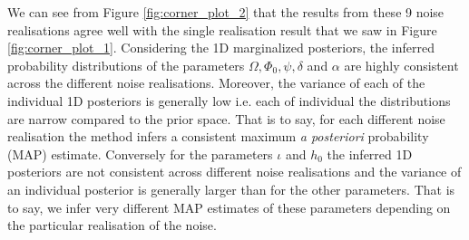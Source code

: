 \documentclass[fleqn,usenatbib,useAMS]{mnras}
\begin{document}
We can see from Figure \ref{fig:corner_plot_2} that the results from these 9 noise realisations agree well with the single realisation result that we saw in  Figure \ref{fig:corner_plot_1}. Considering the 1D marginalized posteriors, the inferred probability distributions of the parameters $\Omega, \Phi_0, \psi, \delta$ and $\alpha$ are highly consistent across the different noise realisations. Moreover, the variance of each of the individual 1D posteriors is generally low i.e. each of individual the distributions are narrow compared to the prior space. That is to say, for each different noise realisation the method infers a consistent maximum \textit{a posteriori} probability (MAP) estimate. Conversely for the parameters $\iota$ and $h_0$ the inferred 1D posteriors are not consistent across different noise realisations and the variance of an individual posterior is generally larger than for the other parameters. That is to say, we infer very different MAP estimates of these parameters depending on the particular realisation of the noise. \newline 
\end{document}
